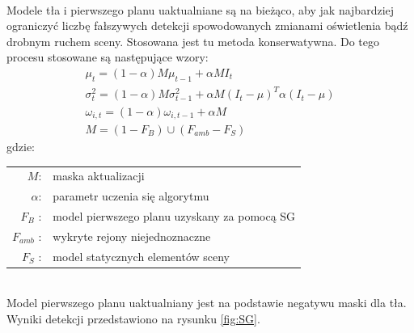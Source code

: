 \paragraph{}
Modele tła i pierwszego planu uaktualniane są na bieżąco, aby jak najbardziej ograniczyć liczbę fałszywych detekcji spowodowanych zmianami oświetlenia bądź drobnym ruchem sceny. Stosowana jest tu metoda konserwatywna. Do tego procesu stosowane są następujące wzory:
\begin{gather}
\mu_{t} = (1-\alpha)M\mu_{t-1}+\alpha MI_{t} \\
\sigma_{t}^2 = (1-\alpha)M\sigma_{t-1}^2+\alpha M(I_{t}-\mu)^{T}\alpha(I_{t}-\mu) \\
\omega_{i,t} = (1-\alpha)\omega_{i,t-1}+\alpha M \\
M = (1-F_{B})\cup(F_{amb}-F_{S})
\end{gather}
gdzie:\\ 
\hspace*{3em}
\begin{tabular}{r p{}}
$M$: &  maska aktualizacji\\
$\alpha$: & parametr uczenia się algorytmu\\
$F_{B}$ : & model pierwszego planu uzyskany za pomocą SG\\
$F_{amb}$ : & wykryte rejony niejednoznaczne \\
$F_{S}$ : & model statycznych elementów sceny
\end{tabular} \\

Model pierwszego planu uaktualniany jest na podstawie negatywu maski dla tła. Wyniki detekcji przedstawiono na rysunku \ref{fig:SG}.

